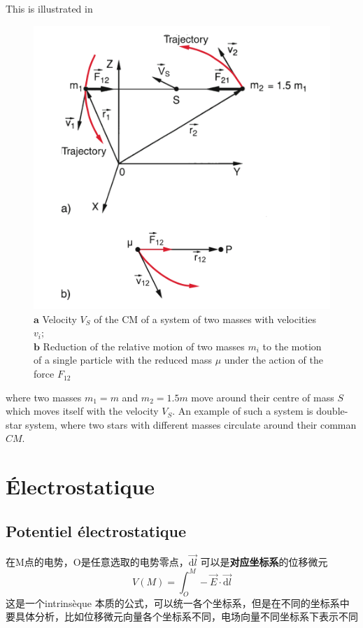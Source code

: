 \documentclass[12pt]{book}
\theoremstyle{definition}\newtheorem{dfn}{Définition}[chapter]
\theoremstyle{plain}\newtheorem{thm}{Théorème}[chapter]
\theoremstyle{plain}\newtheorem{prp}{Proposition}[chapter]
\theoremstyle{plain}\newtheorem{lem}{\bf Lemme}[chapter]
\theoremstyle{plain}\newtheorem{axm}{\bf Axiome}[chapter]
\theoremstyle{plain}\newtheorem{lmm}{\bf Lemme}[chapter]
\theoremstyle{plain}\newtheorem{cor}{\bf Corollaire}[chapter]
\theoremstyle{remark}\newtheorem{rem}{Remarque}[chapter]
\begin{document}
This is illustrated in 
\begin{figure}[H]
	\centering
	\includegraphics[scale=0.7]{image//Systems of Point Masses//2}
	\caption{$\mathbf{a}$ Velocity $V_{S}$ of the CM of a system of two masses with velocities $v_{i} ;$ 
	\\	
	$\mathbf{b}$  Reduction of the relative motion of two masses $m_{i}$ to the motion of a single particle with the reduced mass $\mu$ under the action of the force $F_{12}$}
\end{figure}
where two masses $m_{1}=m$ and $m_{2}=1.5m$ move around their centre of mass $S$ which moves itself with the velocity $V_{S}$. An example of such a system is double-star system, where two stars with different masses circulate around their comman $C M$.

\chapter{Électrostatique}
\section{Potentiel électrostatique}

在M点的电势，O是任意选取的电势零点，$\overrightarrow{\mathrm{d}l}$ 可以是{\bf 对应坐标系}的位移微元
$$
\boxed{V(M)=\int_{O}^{M}-\overrightarrow{E}\cdot\overrightarrow{\mathrm{d}l}}
$$
这是一个intrinsèque 本质的公式，可以统一各个坐标系，但是在不同的坐标系中要具体分析，比如位移微元向量各个坐标系不同，电场向量不同坐标系下表示不同
\end{document}
